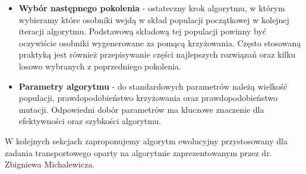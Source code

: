 \begin{itemize}
    [TODO: przyklad]

    \item \textbf{Wybór następnego pokolenia} - ostateczny krok algorytmu, w którym wybieramy które osobniki wejdą w skład populacji początkowej w 
    kolejnej iteracji algorytmu. Podstawową składową tej populacji powinny być oczywiście osobniki wygenerowane za pomącą krzyżowania. Często 
    stosowaną praktyką jest również przepisywanie części najlepszych rozwiązań oraz kilku losowo wybranych z poprzedniego pokolenia. 

    \item \textbf{Parametry algorytmu} - do standardowych parametrów należą wielkość populacji, prawdopodobieństwo krzyżowania oraz prawdopodobieństwo 
    mutacji. Odpowiedni dobór parametrów ma kluczowe znaczenie dla efektywności oraz szybkości algorytmu.

\end{itemize}

W kolejnych sekcjach zaproponujemy algorytm ewolucyjny przystosowany dla zadania transportowego oparty na algorytmie zaprezentowanym przez 
dr. Zbigniewa Michalewicza\cite{ALG-GEN-BOOK}.



